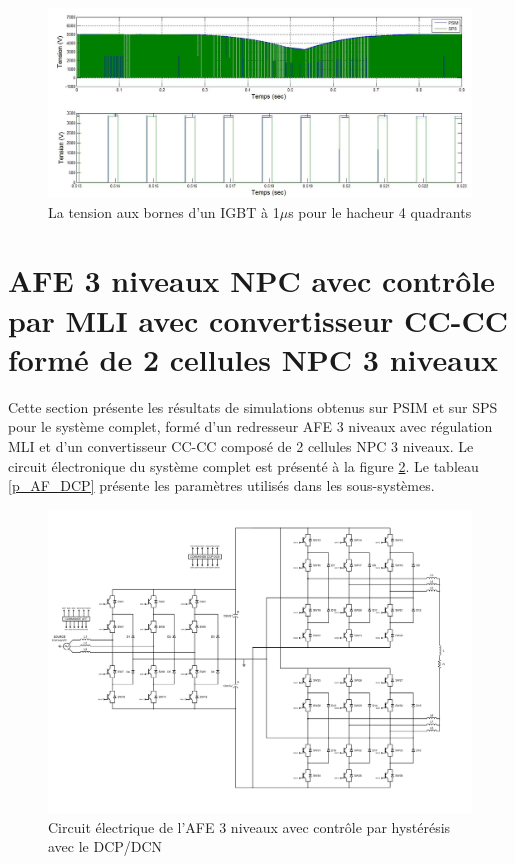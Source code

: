 \begin{figure}[htb]
\centering
\includegraphics[scale=0.5]{fig/Hach_AFE/1u/IGBT_ten_hach.jpg}
\caption{La tension aux bornes d'un IGBT à 1$\mu$s pour le hacheur 4 quadrants}
\label{AF_HA_HAV1}
\end{figure}



\clearpage
\section{AFE 3 niveaux NPC avec contrôle par MLI avec convertisseur CC-CC formé de 2 cellules NPC 3 niveaux}
Cette section présente les résultats de simulations obtenus sur PSIM et sur SPS pour le système complet, formé d'un redresseur AFE 3 niveaux avec régulation MLI et d'un convertisseur CC-CC composé de 2 cellules NPC 3 niveaux.  Le circuit électronique du système complet est présenté à la figure \ref{circuit_AFE_3L_RC_DCP_DCN}. Le tableau \ref{p_AF_DCP} présente les paramètres utilisés dans les sous-systèmes.

\begin{figure}[htb]
\centering
\includegraphics[scale=0.6]{fig/AFE_3L_RC_DCP_DCN.png}
\caption{Circuit électrique de l'AFE 3 niveaux avec contrôle par hystérésis avec le DCP/DCN}
\label{circuit_AFE_3L_RC_DCP_DCN}
\end{figure}


